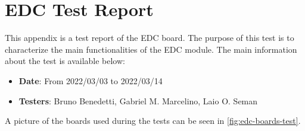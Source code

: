 %
%
%
%
%

%
%
%
%
%

\chapter{EDC Test Report} \label{anx:edc-report}

This appendix is a test report of the EDC board. The purpose of this test is to characterize the main functionalities of the EDC module. The main information about the test is available below:

\begin{itemize}
    \item \textbf{Date}: From 2022/03/03 to 2022/03/14
    \item \textbf{Testers}: Bruno Benedetti, Gabriel M. Marcelino, Laio O. Seman
\end{itemize}

A picture of the boards used during the tests can be seen in \autoref{fig:edc-boards-test}.

